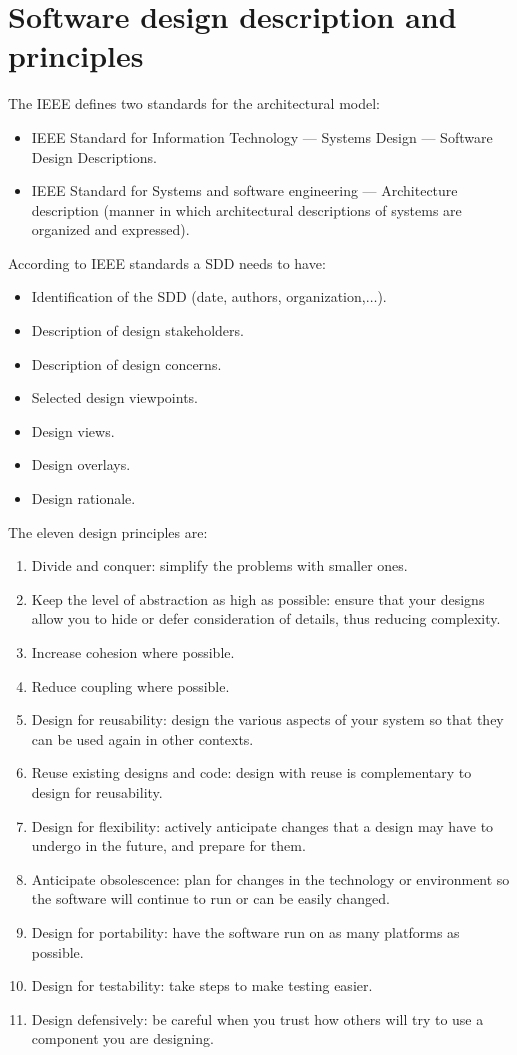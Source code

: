 \documentclass[12pt, a4paper]{report}
\newtheorem[style=M,bodystyle=\normalfont]{theorem}{Theorem}
\newtheorem[style=M,bodystyle=\normalfont]{corollary}{Corollary}
\newtheorem[style=M,bodystyle=\normalfont]{lemma}{Lemma}
\newtheorem[style=M,bodystyle=\normalfont]{definition}{Definition}
\begin{document}
\section{Software design description and principles}  
    The IEEE defines two standards for the architectural model: 
    \begin{itemize}
        \item IEEE Standard for Information Technology — Systems Design — Software Design Descriptions.
        \item IEEE Standard for Systems and software engineering — Architecture description (manner in which architectural descriptions of systems are organized and expressed).
    \end{itemize}
    According to IEEE standards a SDD needs to have: 
    \begin{itemize}
        \item Identification of the SDD (date, authors, organization,$\dots$).
        \item Description of design stakeholders.
        \item Description of design concerns.
        \item Selected design viewpoints.
        \item Design views.
        \item Design overlays.
        \item Design rationale.
    \end{itemize}
    The eleven design principles are: 
    \begin{enumerate}
        \item Divide and conquer: simplify the problems with smaller ones.
        \item Keep the level of abstraction as high as possible: ensure that your designs allow you to hide or defer consideration of details, thus reducing complexity.
        \item Increase cohesion where possible.
        \item Reduce coupling where possible.
        \item Design for reusability: design the various aspects of your system so that they can be used again in other contexts.
        \item Reuse existing designs and code: design with reuse is complementary to design for reusability.
        \item Design for flexibility: actively anticipate changes that a design may have to undergo in the future, and prepare for them. 
        \item Anticipate obsolescence: plan for changes in the technology or environment so the software will continue to run or can be easily changed. 
        \item Design for portability: have the software run on as many platforms as possible. 
        \item Design for testability: take steps to make testing easier.
        \item Design defensively: be careful when you trust how others will try to use a component you are designing.
    \end{enumerate}
\end{document}
